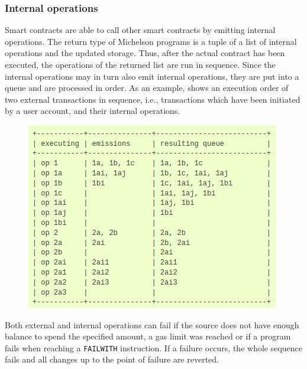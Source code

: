 \subsubsection{Internal operations}
Smart contracts are able to call other smart contracts by emitting internal operations. The return type of Michelson programs is a tuple of a list of internal operations and the updated storage. Thus, after the actual contract has been executed, the operations of the returned list are run in sequence. Since the internal operations may in turn also emit internal operations, they are put into a queue and are processed in order. As an example,  shows an execution order of two external transactions in sequence, i.e., transactions which have been initiated by a user account, and their internal operations.
\begin{figure}[h]
\centering
\includegraphics[width=0.5\linewidth]{figures/4-offline_tezos/internal_ops}
\label{fig:internal_ops}
\end{figure}

Both external and internal operations can fail if the source does not have enough balance to spend the specified amount, a gas limit was reached or if a program fails when reaching a \texttt{FAILWITH} instruction. If a failure occurs, the whole sequence fails and all changes up to the point of failure are reverted.

